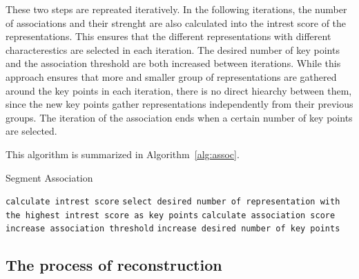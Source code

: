 These two steps are repreated iteratively. In the following iterations, the number of associations and their strenght are also calculated into the intrest score of the representations. This ensures that the different representations with different characterestics are selected in each iteration. The desired number of key points and the association threshold are both increased between iterations. While this approach ensures that more and smaller group of representations are gathered around the key points in each iteration, there is no direct hiearchy between them, since the new key points gather representations independently from their previous groups. The iteration of the association ends when a certain number of key points are selected.

This algorithm is summarized in Algorithm~\ref{alg:assoc}.

\begin{algorithm}
\caption{Segment Association}\label{alg:assoc}
\begin{algorithmic}
        \State \texttt{calculate intrest score}
    \EndFor
    \State \texttt{select desired number of representation with the highest intrest score as key points}
            \State \texttt{calculate association score}
            \EndIf
        \EndFor
    \EndFor
    \State \texttt{increase association threshold}
    \State \texttt{increase desired number of key points}
\EndWhile
\end{algorithmic}
\end{algorithm}

\subsection{The process of reconstruction} %


